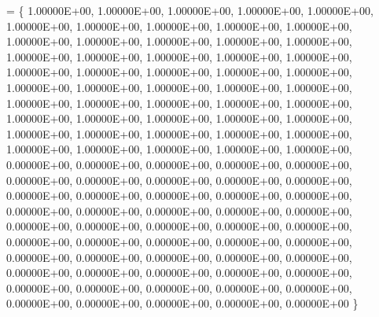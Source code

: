 \begin{DoxyCode}
= \{
     1.00000E+00, 1.00000E+00, 1.00000E+00, 1.00000E+00, 1.00000E+00,
     1.00000E+00, 1.00000E+00, 1.00000E+00, 1.00000E+00, 1.00000E+00,
     1.00000E+00, 1.00000E+00, 1.00000E+00, 1.00000E+00, 1.00000E+00,
     1.00000E+00, 1.00000E+00, 1.00000E+00, 1.00000E+00, 1.00000E+00,
     1.00000E+00, 1.00000E+00, 1.00000E+00, 1.00000E+00, 1.00000E+00,
     1.00000E+00, 1.00000E+00, 1.00000E+00, 1.00000E+00, 1.00000E+00,
     1.00000E+00, 1.00000E+00, 1.00000E+00, 1.00000E+00, 1.00000E+00,
     1.00000E+00, 1.00000E+00, 1.00000E+00, 1.00000E+00, 1.00000E+00,
     1.00000E+00, 1.00000E+00, 1.00000E+00, 1.00000E+00, 1.00000E+00,
     1.00000E+00, 1.00000E+00, 1.00000E+00, 1.00000E+00, 1.00000E+00,
     0.00000E+00, 0.00000E+00, 0.00000E+00, 0.00000E+00, 0.00000E+00,
     0.00000E+00, 0.00000E+00, 0.00000E+00, 0.00000E+00, 0.00000E+00,
     0.00000E+00, 0.00000E+00, 0.00000E+00, 0.00000E+00, 0.00000E+00,
     0.00000E+00, 0.00000E+00, 0.00000E+00, 0.00000E+00, 0.00000E+00,
     0.00000E+00, 0.00000E+00, 0.00000E+00, 0.00000E+00, 0.00000E+00,
     0.00000E+00, 0.00000E+00, 0.00000E+00, 0.00000E+00, 0.00000E+00,
     0.00000E+00, 0.00000E+00, 0.00000E+00, 0.00000E+00, 0.00000E+00,
     0.00000E+00, 0.00000E+00, 0.00000E+00, 0.00000E+00, 0.00000E+00,
     0.00000E+00, 0.00000E+00, 0.00000E+00, 0.00000E+00, 0.00000E+00,
     0.00000E+00, 0.00000E+00, 0.00000E+00, 0.00000E+00, 0.00000E+00
\}
\end{DoxyCode}
